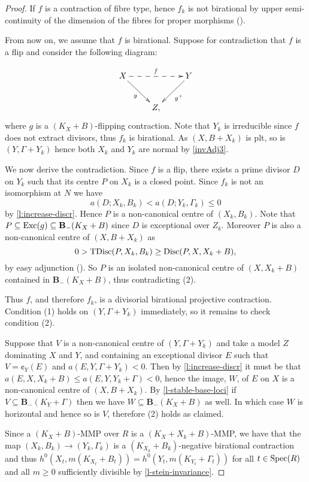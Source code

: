 \begin{proof}
	If $f$ is a contraction of fibre type, hence $f_k$ is not birational by upper semi-continuity of the dimension of the fibres for proper morphisms (\cite[\href{https://stacks.math.columbia.edu/tag/0D4Q}{Tag 0D4Q}]{stacks-project}). 
	
	From now on, we assume that $f$ is birational. Suppose for contradiction that $f$ is a flip and consider the following diagram:
	
	\begin{equation*}
	\xymatrix{
		X \ar@{->}_{g}[rd] \ar@{-->}^{f}[rr]
		&
		& Y \ar@{->}^{g^+}[ld]\\
		&Z,}
	\end{equation*} 
	where $g$ is a $(K_X+B)$-flipping contraction.
	Note that $Y_k$ is irreducible since $f$ does not extract divisors, thus $f_k$ is birational. As $(X,B+X_k)$ is plt, so is $(Y,\Gamma+Y_k)$ hence both $X_k$ and $Y_k$ are normal by \autoref{invAdj3}. 
	
	We now derive the contradiction. Since $f$ is a flip, there exists a prime divisor $D$ on $Y_k$ such that its centre $P$ on $X_k$ is a closed point.
	Since $f_k$ is not an isomorphism at $N$ we have
	$$a(D;X_k,B_k)<a(D;Y_k,\Gamma_k)\leq 0$$
	by \autoref{l:increase-discr}.
	Hence $P$ is a non-canonical centre of $(X_{k},B_k)$. Note that $P \subseteq \textup{Exc}(g) \subseteq \mathbf{B}_{-}(K_{X}+B)$ since $D$ is exceptional over $Z_k$. 
	Moreover $P$ is also a non-canonical centre of $(X,B+X_{k})$ as $$0 > \textup{TDisc}(P, X_k, B_k) \geq \textup{Disc}(P, X, X_k+B), $$ by easy adjunction (\cite[Lemma 4.8]{kk-singbook}).
	So $P$ is an isolated non-canonical centre of $(X,X_k+B)$ contained in $\mathbf{B}_{-}(K_{X}+B)$, thus contradicting (2).
	
	Thus $f$, and therefore $f_k$, is a divisorial birational projective contraction. Condition (1) holds on $(Y,\Gamma+Y_k)$ immediately, so it remains to check condition (2).
	
	Suppose that $V$ is a non-canonical centre of $(Y,\Gamma+Y_{k})$ and take a model $Z$ dominating $X$ and $Y$, and containing an exceptional divisor $E$ such that $V=\cent_Y(E)$ and $a(E, Y, \Gamma+Y_{k}) <0$. Then by \autoref{l:increase-discr} it must be that $a(E,X,X_k+B) \leq a(E,Y,Y_{k}+\Gamma) < 0$, hence the image, $W$, of $E$ on $X$ is a non-canonical centre of $(X,B+X_{k})$. By \autoref{l-stable-base-loci} if $V \subseteq \mathbf{B}_{-}(K_{Y}+\Gamma)$ then we have $W \subseteq \mathbf{B}_{-}(K_{X}+B)$ as well. In which case $W$ is horizontal and hence so is $V$, therefore (2) holds as claimed.
	
	Since a $(K_X+B)$-MMP over $R$ is a $(K_X+X_k+B)$-MMP, we have that the map $(X_k,B_k) \rightarrow (Y_k, \Gamma_k)$ is a $(K_{X_k}+B_k)$-negative birational contraction and thus $h^0(X_t,m(K_{X_t}+B_t))=h^0(Y_t,m(K_{Y_t}+\Gamma_t))$ for all $t\in\operatorname{Spec} (R)$ and all $m\geq 0$ sufficiently divisible by \autoref{l-stein-invariance}.
\end{proof}

